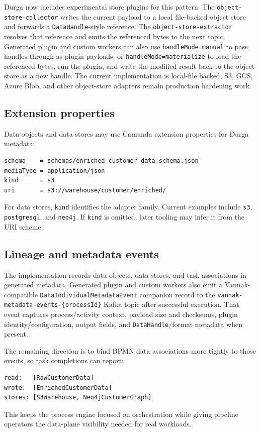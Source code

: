 Durga now includes experimental store plugins for this pattern. The
\texttt{object-store-collector} writes the current payload to a local file-backed
object store and forwards a \texttt{DataHandle}-style reference. The
\texttt{object-store-extractor} resolves that reference and emits the referenced
bytes to the next topic. Generated plugin and custom workers can also use
\texttt{handleMode=manual} to pass handles through as plugin payloads, or
\texttt{handleMode=materialize} to load the referenced bytes, run the plugin, and
write the modified result back to the object store as a new handle. The current
implementation is local-file backed; S3, GCS, Azure Blob, and other object-store
adapters remain production hardening work.

\subsection{Extension properties}

Data objects and data stores may use Camunda extension properties for Durga
metadata:

\begin{verbatim}
schema    = schemas/enriched-customer-data.schema.json
mediaType = application/json
kind      = s3
uri       = s3://warehouse/customer/enriched/
\end{verbatim}

For data stores, \texttt{kind} identifies the adapter family. Current examples
include \texttt{s3}, \texttt{postgresql}, and \texttt{neo4j}. If \texttt{kind}
is omitted, later tooling may infer it from the URI scheme.

\subsection{Lineage and metadata events}

The implementation records data objects, data stores, and task associations in
generated metadata. Generated plugin and custom workers also emit a
Vannak-compatible \texttt{DataIndividualMetadataEvent} companion record to the
\texttt{vannak-metadata-events-\{processId\}} Kafka topic after successful execution. That
event captures process/activity context, payload size and checksums, plugin
identity/configuration, output fields, and \texttt{DataHandle}/format metadata
when present.

The remaining direction is to bind BPMN data associations more tightly to those
events, so task completions can report:

\begin{verbatim}
read:   [RawCustomerData]
wrote:  [EnrichedCustomerData]
stores: [S3Warehouse, Neo4jCustomerGraph]
\end{verbatim}

This keeps the process engine focused on orchestration while giving pipeline
operators the data-plane visibility needed for real workloads.
